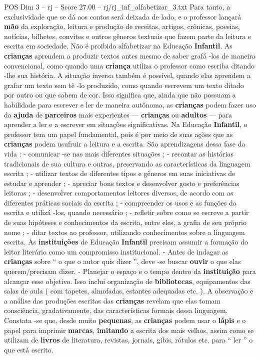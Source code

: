 \begin{textsample}{POS Dim 3 – rj – Score 27.00 – rj/rj\_inf\_alfabetizar\_3.txt}
Para tanto, a exclusividade que se dá aos contos será deixada de lado, e o professor lançará \textbf{mão} da exploração, leitura e produção de receitas, artigos, crônicas, poesias, notícias, bilhetes, convites e outros gêneros textuais que fazem parte da leitura e escrita em sociedade.
Não é proibido alfabetizar na Educação \textbf{Infantil}.
As \textbf{crianças} aprendem a produzir textos antes mesmo de saber grafá -los de maneira convencional, como quando uma \textbf{criança} utiliza o professor como escriba ditando -lhe sua história.
A situação inversa também é possível, quando elas aprendem a grafar um texto sem tê -lo produzido, como quando escrevem um texto ditado por outro ou que sabem de cor.
Isso significa que, ainda que não possuam a habilidade para escrever e ler de maneira autônoma, as \textbf{crianças} podem fazer uso da \textbf{ajuda} de \textbf{parceiros} mais experientes — \textbf{crianças} ou \textbf{adultos} — para aprender a ler e a escrever em situações significativas.
Na Educação \textbf{Infantil}, o professor tem um papel fundamental, pois é por meio de suas ações que as \textbf{crianças} podem usufruir a leitura e a escrita.
São aprendizagens dessa fase da vida : - comunicar -se nas mais diferentes situações ; - recontar as histórias tradicionais de sua cultura e outras, preservando as características da linguagem escrita ; - utilizar textos de diferentes tipos e gêneros em suas iniciativas de estudar e aprender ; - apreciar bons textos e desenvolver gosto e preferências leitoras ; - desenvolver comportamentos leitores diversos, de acordo com as diferentes práticas sociais da escrita ; - compreender os usos e as funções da escrita e utilizá -los, quando necessário ; - refletir sobre como se escreve a partir de suas hipóteses e conhecimentos da escrita, entre eles, a grafia de seu próprio nome ; - ditar textos ao professor, utilizando conhecimentos sobre a linguagem escrita.
As \textbf{instituições} de Educação \textbf{Infantil} precisam assumir a formação do leitor literário como um compromisso institucional. - Antes de indagar as \textbf{crianças} sobre “ o que o autor quis dizer ”, deve -se buscar \textbf{ouvir} o que elas querem/precisam dizer. - Planejar o espaço e o tempo dentro da \textbf{instituição} para alcançar esse objetivo.
Isso inclui organização de \textbf{bibliotecas}, equipamentos das salas de aula ( com tapetes, almofadas, estantes adequadas etc. ).
A observação e a análise das produções escritas das \textbf{crianças} revelam que elas tomam consciência, gradativamente, das características formais dessa linguagem.
Constata -se que, desde muito \textbf{pequenas}, as \textbf{crianças} podem usar o \textbf{lápis} e o papel para imprimir \textbf{marcas}, \textbf{imitando} a escrita dos mais velhos, assim como se utilizam de \textbf{livros} de literatura, revistas, jornais, gibis, rótulos etc. para “ ler ” o que está escrito.

\end{textsample}
